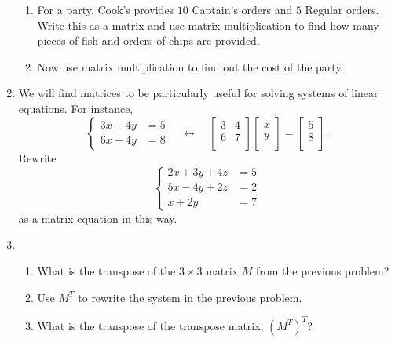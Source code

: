 \documentclass[../gatm.tex]{subfiles}
\begin{document}
\begin{enumerate}
\begin{enumerate}
\item For a party, Cook's provides $10$ Captain's orders and $5$ Regular orders. Write this as a matrix and use matrix multiplication to find how many pieces of fish and orders of chips are provided.
\item Now use matrix multiplication to find out the cost of the party.
\end{enumerate}
\item We will find matrices to be particularly useful for solving systems of linear equations. For instance, $$\begin{cases}3x+4y&=5 \\ 6x+4y &= 8\end{cases}\quad\longleftrightarrow\quad\left[\begin{array}{cc} 3 & 4 \\ 6 & 7 \\ \end{array}\right]\left[\begin{array}{c} x \\ y \\ \end{array}\right]=\left[\begin{array}{c} 5 \\ 8 \\ \end{array}\right].$$ Rewrite $$\begin{cases}2x+3y+4z&=5 \\ 5x-4y+2z &= 2 \\ x+2y &= 7\end{cases}$$ as a matrix equation in this way.
\item \begin{enumerate}
\item What is the transpose of the $3\times 3$ matrix $M$ from the previous problem?
\item Use $M^T$ to rewrite the system in the previous problem.
\item What is the transpose of the transpose matrix, $(M^T)^T$?
\end{enumerate}
\end{enumerate}
\end{document}
